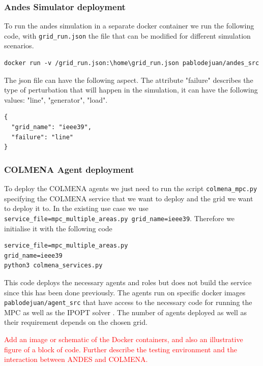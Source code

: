 \documentclass{article}
\begin{document}
\subsubsection*{Andes Simulator deployment}

To run the andes simulation in a separate docker container we run the following code, with \texttt{grid\_run.json} the file that can be modified for different simulation scenarios. 


\begin{verbatim}
docker run -v /grid_run.json:\home\grid_run.json pablodejuan/andes_src
\end{verbatim}

The json file can have the following aspect. The attribute "failure" describes the type of perturbation that will happen in the simulation, it can have the following values: "line", "generator", "load".

\begin{verbatim}
{
  "grid_name": "ieee39",
  "failure": "line"
}
\end{verbatim}

\subsubsection*{COLMENA Agent deployment}

To deploy the COLMENA agents we just need to run the script \texttt{colmena\_mpc.py} specifying the COLMENA service that we want to deploy and the grid we want to deploy it to. In the existing use case we use \texttt{service\_file=mpc\_multiple\_areas.py grid\_name=ieee39}. Therefore we initialise it with the following code

\begin{verbatim}
service_file=mpc_multiple_areas.py 
grid_name=ieee39 
python3 colmena_services.py
\end{verbatim}

This code deploys the necessary agents and roles but does not build the service since this has been done previously. The agents run on specific docker images \texttt{pablodejuan/agent\_src} that have access to the necessary code for running the MPC as well as the IPOPT solver \cite{coinor-ipopt}. The number of agents deployed as well as their requirement depends on the chosen grid.

\textcolor{red}{Add an image or schematic of the Docker containers, and also an illustrative figure of a block of code. Further describe the testing environment and the interaction between ANDES and COLMENA.}
\end{document}
